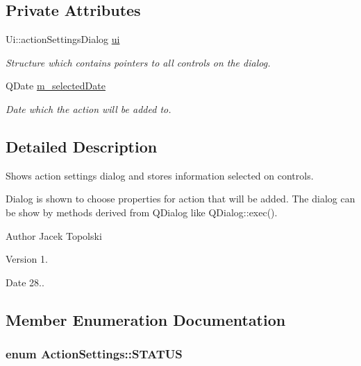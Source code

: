 \subsection*{Private Attributes}
\begin{DoxyCompactItemize}
\item 
Ui\-::action\-Settings\-Dialog \hyperlink{class_action_settings_a426f219e053b2eb7d534fd78cf83d026}{ui}
\begin{DoxyCompactList}\small\item\em Structure which contains pointers to all controls on the dialog. \end{DoxyCompactList}\item 
Q\-Date \hyperlink{class_action_settings_a3aa508428dcaa5c930b6a46d6471a770}{m\-\_\-selected\-Date}
\begin{DoxyCompactList}\small\item\em Date which the action will be added to. \end{DoxyCompactList}\end{DoxyCompactItemize}


\subsection{Detailed Description}
Shows action settings dialog and stores information selected on controls. 

Dialog is shown to choose properties for action that will be added. The dialog can be show by methods derived from Q\-Dialog like Q\-Dialog\-::exec(). \begin{DoxyAuthor}{Author}
Jacek Topolski 
\end{DoxyAuthor}
\begin{DoxyVersion}{Version}
1. 
\end{DoxyVersion}
\begin{DoxyDate}{Date}
28.. 
\end{DoxyDate}


\subsection{Member Enumeration Documentation}
\hypertarget{class_action_settings_a9725793607519082b0c0bcfae7ccdcaf}{
\subsubsection[{S\-T\-A\-T\-U\-S}]{\setlength{\rightskip}{0pt plus 5cm}enum {\bf Action\-Settings\-::\-S\-T\-A\-T\-U\-S}\hspace{0.3cm}{\ttfamily [private]}}}\label{class_action_settings_a9725793607519082b0c0bcfae7ccdcaf}


